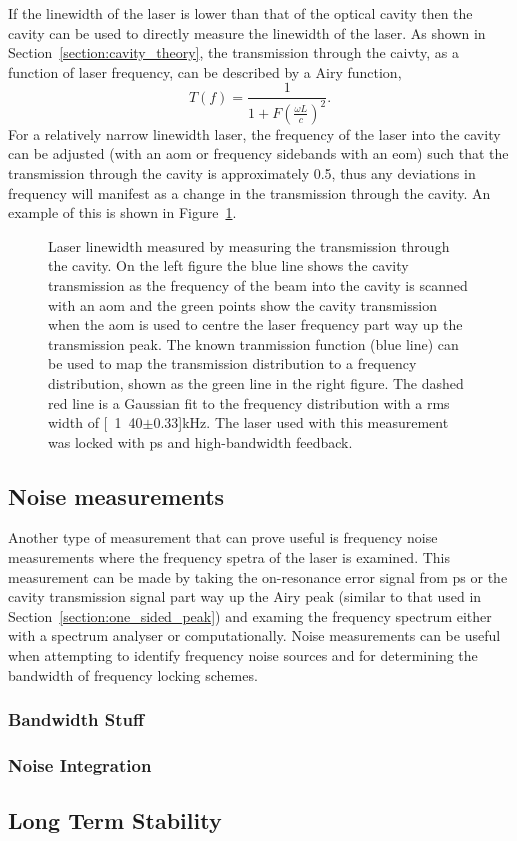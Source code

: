 If the linewidth of the laser is lower than that of the optical cavity then the cavity can be used to directly measure the linewidth of the laser.
As shown in Section~\ref{section:cavity_theory}, the transmission through the caivty, as a function of laser frequency, can be described by a Airy function,
\begin{equation}
T(f) = \frac{1}{1+F\left(\frac{\omega L}{c}\right)^2}.
\end{equation}
For a relatively narrow linewidth laser, the frequency of the laser into the cavity can be adjusted (with an \gls{aom} or frequency sidebands with an \gls{eom}) such that the transmission through the cavity is approximately 0.5, thus any deviations in frequency will manifest as a change in the transmission through the cavity.
An example of this is shown in Figure~\ref{figure:side_of_peak}.

\begin{figure}
\center

\caption{Laser linewidth measured by measuring the transmission through the cavity. On the left figure the blue line shows the cavity transmission as the frequency of the beam into the cavity is scanned with an \gls{aom} and the green points show the cavity transmission when the \gls{aom} is used to centre the laser frequency part way up the transmission peak.
The known tranmission function (blue line) can be used to map the transmission distribution to a frequency distribution, shown as the green line in the right figure.
The dashed red line is a Gaussian fit to the frequency distribution with a \gls{rms} width of \unit[1.40$\pm$0.33]{kHz}.
The laser used with this measurement was locked with \gls{ps} and high-bandwidth feedback.}
\label{figure:side_of_peak}
\end{figure}

\subsection{Noise measurements}

Another type of measurement that can prove useful is frequency noise measurements where the frequency spetra of the laser is examined.
This measurement can be made by taking the on-resonance error signal from \gls{ps} or the cavity transmission signal part way up the Airy peak (similar to that used in Section~\ref{section:one_sided_peak}) and examing the frequency spectrum either with a spectrum analyser or computationally.
Noise measurements can be useful when attempting to identify frequency noise sources and for determining the bandwidth of frequency locking schemes.

\subsubsection{Bandwidth Stuff}

\subsubsection{Noise Integration}

\subsection{Long Term Stability}

